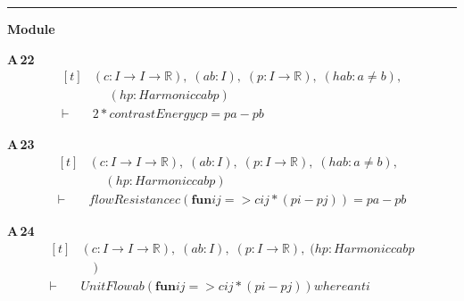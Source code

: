 \vspace{4pt}\noindent\rule{\columnwidth}{0.4pt}\par\vspace{2pt}
\noindent\textbf{Module }\par\vspace{3pt}

\noindent\textbf{A\,22}\quad{}
{\footnotesize\[ \begin{aligned}[t]
&(\mathit{c} : \mathit{I} \to \mathit{I} \to \mathbb{R} ),\; (\mathit{a} \mathit{b} : \mathit{I}),\; (\mathit{p} : \mathit{I} \to \mathbb{R} ),\; (\mathit{hab} : \mathit{a} \neq \mathit{b}),\\
&\quad \; (\mathit{hp} : \mathit{Harmonic} \mathit{c} \mathit{a} \mathit{b} \mathit{p})\\
\vdash\;&2*\mathit{contrastEnergy} \mathit{c} \mathit{p} = \mathit{p} \mathit{a}-\mathit{p} \mathit{b}
\end{aligned} \]}

\noindent\textbf{A\,23}\quad{}
{\footnotesize\[ \begin{aligned}[t]
&(\mathit{c} : \mathit{I} \to \mathit{I} \to \mathbb{R} ),\; (\mathit{a} \mathit{b} : \mathit{I}),\; (\mathit{p} : \mathit{I} \to \mathbb{R} ),\; (\mathit{hab} : \mathit{a} \neq \mathit{b}),\\
&\quad \; (\mathit{hp} : \mathit{Harmonic} \mathit{c} \mathit{a} \mathit{b} \mathit{p})\\
\vdash\;&\mathit{flowResistance} \mathit{c} (\mathbf{fun} \mathit{i} \mathit{j} => \mathit{c} \mathit{i} \mathit{j}*(\mathit{p} \mathit{i}-\mathit{p} \mathit{j})) = \mathit{p} \mathit{a}-\mathit{p} \mathit{b}
\end{aligned} \]}

\noindent\textbf{A\,24}\quad{}
{\footnotesize\[ \begin{aligned}[t]
&(\mathit{c} : \mathit{I} \to \mathit{I} \to \mathbb{R} ),\; (\mathit{a} \mathit{b} : \mathit{I}),\; (\mathit{p} : \mathit{I} \to \mathbb{R} ),\; (\mathit{hp} : \mathit{Harmonic} \mathit{c} \mathit{a} \mathit{b} \mathit{p}\\
&\quad )\\
\vdash\;&\mathit{UnitFlow} \mathit{a} \mathit{b} (\mathbf{fun} \mathit{i} \mathit{j} => \mathit{c} \mathit{i} \mathit{j}*(\mathit{p} \mathit{i}-\mathit{p} \mathit{j})) \mathit{where} \mathit{anti}
\end{aligned} \]}

